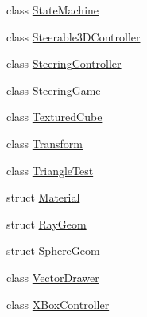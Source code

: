 \begin{DoxyCompactItemize}
class \hyperlink{class_b_g_e_1_1_state_machine}{State\-Machine}
\item 
class \hyperlink{class_b_g_e_1_1_steerable3_d_controller}{Steerable3\-D\-Controller}
\item 
class \hyperlink{class_b_g_e_1_1_steering_controller}{Steering\-Controller}
\item 
class \hyperlink{class_b_g_e_1_1_steering_game}{Steering\-Game}
\item 
class \hyperlink{class_b_g_e_1_1_textured_cube}{Textured\-Cube}
\item 
class \hyperlink{class_b_g_e_1_1_transform}{Transform}
\item 
class \hyperlink{class_b_g_e_1_1_triangle_test}{Triangle\-Test}
\item 
struct \hyperlink{struct_b_g_e_1_1_material}{Material}
\item 
struct \hyperlink{struct_b_g_e_1_1_ray_geom}{Ray\-Geom}
\item 
struct \hyperlink{struct_b_g_e_1_1_sphere_geom}{Sphere\-Geom}
\item 
class \hyperlink{class_b_g_e_1_1_vector_drawer}{Vector\-Drawer}
\item 
class \hyperlink{class_b_g_e_1_1_x_box_controller}{X\-Box\-Controller}
\end{DoxyCompactItemize}
